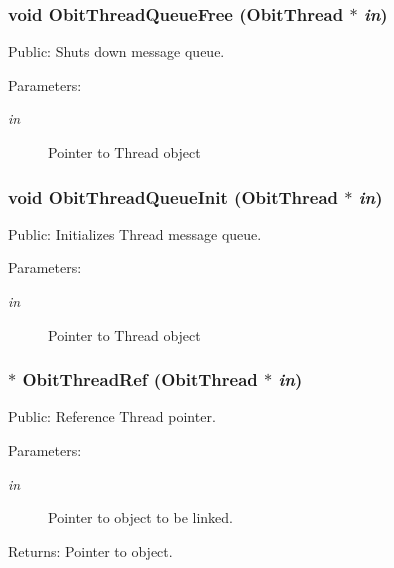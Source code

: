 \subsubsection{\setlength{\rightskip}{0pt plus 5cm}void Obit\-Thread\-Queue\-Free ({\bf Obit\-Thread} $\ast$ {\em in})}\label{ObitThread_8h_a29}


Public: Shuts down message queue. 

\begin{Desc}
\item[Parameters:]
\begin{description}
\item[{\em in}]Pointer to Thread object \end{description}
\end{Desc}
\subsubsection{\setlength{\rightskip}{0pt plus 5cm}void Obit\-Thread\-Queue\-Init ({\bf Obit\-Thread} $\ast$ {\em in})}\label{ObitThread_8h_a27}


Public: Initializes Thread message queue. 

\begin{Desc}
\item[Parameters:]
\begin{description}
\item[{\em in}]Pointer to Thread object \end{description}
\end{Desc}
\subsubsection{$\ast$ Obit\-Thread\-Ref ({\bf Obit\-Thread} $\ast$ {\em in})}\label{ObitThread_8h_a4}


Public: Reference Thread pointer. 

\begin{Desc}
\item[Parameters:]
\begin{description}
\item[{\em in}]Pointer to object to be linked. \end{description}
\end{Desc}
\begin{Desc}
\item[Returns:]Pointer to object. \end{Desc}
